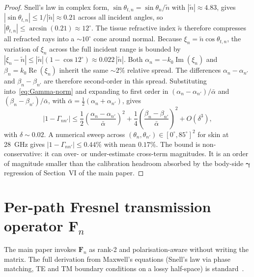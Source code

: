 \documentclass[10pt,journal,twocolumn]{IEEEtran}
\newcommand{\Fn}{\mathbf{F}_n}
\newcommand{\gammab}{\bm{\gamma}}
\newcommand{\ntilde}{\tilde{n}}
\DeclareMathOperator{\RE}{Re}
\DeclareMathOperator{\IM}{Im}
\theoremstyle{plain}
\theoremstyle{definition}
\begin{document}
\begin{proof}
Snell's law in complex form, $\sin\theta_{t,n} = \sin\theta_n/\ntilde$
with $|\ntilde| \approx 4.83$, gives
$|\sin\theta_{t,n}| \leq 1/|\ntilde| \approx 0.21$ across all
incident angles, so $|\theta_{t,n}| \leq \arcsin(0.21) \approx
12^{\circ}$. The tissue refractive index $\ntilde$ therefore
compresses all refracted rays into a $\sim\!10^{\circ}$ cone around
normal. Because $\xi_n = \ntilde \cos\theta_{t,n}$, the variation
of $\xi_n$ across the full incident range is bounded by
$|\xi_n - \ntilde| \leq |\ntilde|(1 - \cos 12^{\circ}) \approx
0.022\,|\ntilde|$. Both $\alpha_n = -k_0 \IM(\xi_n)$ and
$\beta_n = k_0 \RE(\xi_n)$ inherit the same $\sim\!2\%$ relative
spread. The differences $\alpha_n - \alpha_{n'}$ and
$\beta_n - \beta_{n'}$ are therefore second-order in this spread.
Substituting into~\eqref{eq:Gamma-norm} and expanding to first
order in $(\alpha_n - \alpha_{n'})/\bar\alpha$ and
$(\beta_n - \beta_{n'})/\bar\alpha$, with
$\bar\alpha = \tfrac{1}{2}(\alpha_n + \alpha_{n'})$, gives
\begin{equation}
  |1 - \Gamma_{nn'}|
    \leq \frac{1}{2}
    \left(\frac{\alpha_n - \alpha_{n'}}{\bar\alpha}\right)^2
    + \frac{1}{4}
    \left(\frac{\beta_n - \beta_{n'}}{\bar\alpha}\right)^2
    + O(\delta^3),
\end{equation}
with $\delta \sim 0.02$. A numerical sweep across
$(\theta_n, \theta_{n'}) \in [0^{\circ}, 85^{\circ}]^2$ for skin at
28~GHz gives $|1 - \Gamma_{nn'}| \leq 0.44\%$ with mean $0.17\%$.
The bound is non-conservative: it can over- or under-estimate
cross-term magnitudes. It is an order of magnitude smaller than the
calibration headroom absorbed by the body-side $\gammab$ regression
of Section~VI of the main paper.
\end{proof}

\section{Per-path Fresnel transmission operator $\mathbf{F}_n$}\label{si:Fn}

The main paper invokes $\Fn$ as rank-2 and polarisation-aware
without writing the matrix. The full derivation from Maxwell's
equations (Snell's law via phase matching, TE and TM boundary
conditions on a lossy half-space) is standard~\cite{BornWolf}.
\end{document}
